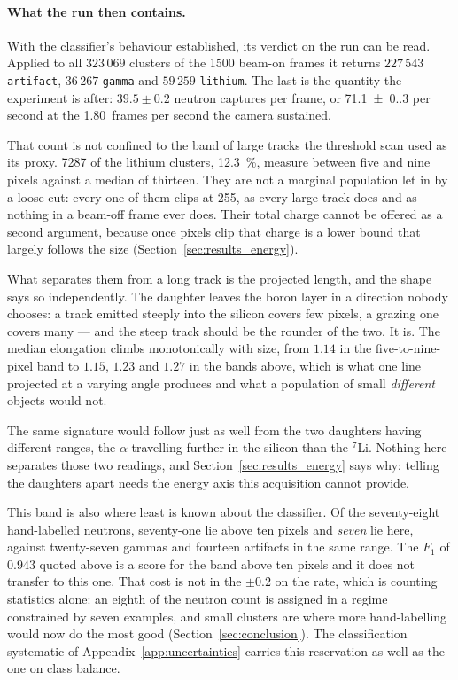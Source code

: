 \documentclass[a4paper,headsepline,oneside,11pt]{scrartcl}
\begin{document}
\paragraph{What the run then contains.} With the classifier's behaviour
established, its verdict on the run can be read. Applied to all $323\,069$
clusters of the 1500 beam-on frames it returns $227\,543$ \texttt{artifact},
$36\,267$ \texttt{gamma} and $59\,259$ \texttt{lithium}. The last is the
quantity the experiment is after: $39.5 \pm 0.2$ neutron captures per frame, or
\num{71.1(0.3)} per second at the \num{1.80}~frames per second the camera sustained.

That count is not confined to the band of large tracks the threshold scan used
as its proxy. \num{7287} of the lithium clusters, \SI{12.3}{\percent}, measure
between five and nine pixels against a median of thirteen. They are not a
marginal population let in by a loose cut: every one of them clips at
\SI{255}{\ADU}, as every large track does and as nothing in a beam-off frame
ever does. Their total charge cannot be offered as a second argument, because
once pixels clip that charge is a lower bound that largely follows the size
(Section~\ref{sec:results_energy}).

What separates them from a long track is the projected length, and the shape
says so independently. The daughter leaves the boron layer in a direction nobody
chooses: a track emitted steeply into the silicon covers few pixels, a grazing
one covers many --- and the steep track should be the rounder of the two. It is.
The median elongation climbs monotonically with size, from $1.14$ in the
five-to-nine-pixel band to $1.15$, $1.23$ and $1.27$ in the bands above, which is
what one line projected at a varying angle produces and what a population of
small \emph{different} objects would not.

The same signature would follow just as well from the two daughters having
different ranges, the $\alpha$ travelling further in the silicon than the
$^7$Li. Nothing here separates those two readings, and
Section~\ref{sec:results_energy} says why: telling the daughters apart needs the
energy axis this acquisition cannot provide.

This band is also where least is known about the classifier. Of the
seventy-eight hand-labelled neutrons, seventy-one lie above ten pixels and
\emph{seven} lie here, against twenty-seven gammas and fourteen artifacts in the
same range. The $F_1$ of $0.943$ quoted above is a score for the band above ten
pixels and it does not transfer to this one. That cost is not in the $\pm 0.2$
on the rate, which is counting statistics alone: an eighth of the neutron count
is assigned in a regime constrained by seven examples, and small clusters are
where more hand-labelling would now do the most good
(Section~\ref{sec:conclusion}). The classification systematic of
Appendix~\ref{app:uncertainties} carries this reservation as well as the one on
class balance.
\end{document}
